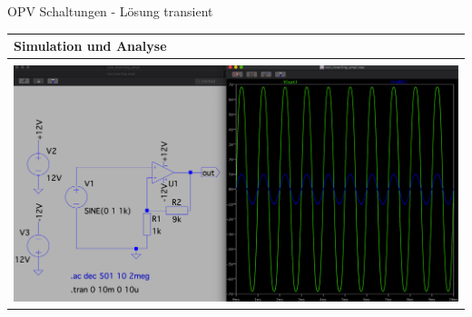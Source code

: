           \begin{frame}[t]{OPV Schaltungen - Lösung transient}

              \begin{spacing}{0.9} \begin{tiny}
                \begin{table}[h!]
                \begin{tabular}{p{10cm}}
                  \hline
                  \textbf{Simulation und Analyse} \\
                  \hline \\
                  \begin{minipage}{\textwidth}
                    \includegraphics[width=\linewidth]{pictures/analysis_7.png}
                  \end{minipage} 
                  \\
                \end{tabular}
      
              \end{table}
               
              \end{tiny} \end{spacing}

          \end{frame}

